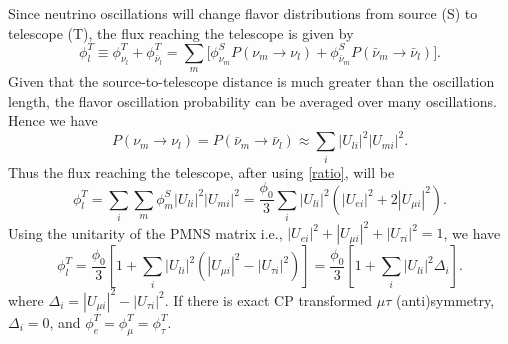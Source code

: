 \documentclass[11pt]{article}
\begin{document}
Since neutrino oscillations will change flavor distributions from source (S) to telescope (T)\cite{Xing:2006uk}, the flux reaching the telescope is given by\begin{equation}
\phi^T_{l}\equiv\phi^T_{\nu_l}+\phi^T_{\bar{\nu}_l}=\sum\limits_{m}
\Big[\phi^S_{\nu_m} P(\nu_m\to\nu_l)+\phi^S_{\bar{\nu}_m}P(\bar{\nu}_m\to
\bar{\nu}_l)\Big].\end{equation} Given that the source-to-telescope distance is much greater than the oscillation length, the flavor oscillation probability can be averaged over many oscillations. Hence we have \begin{equation}P(\nu_m\to\nu_l)=P(\bar{\nu}_m\to
\bar{\nu}_l)\approx \sum\limits_{i}|U_{l i}|^2|U_{m i}|^2.\end{equation} 
Thus the flux reaching the telescope, after using \eqref{ratio}, will be \begin{equation}
\phi_l^T=\sum\limits_{i}\sum\limits_{m}\phi_m^S|U_{l i}|^2|U_{m i}|^2=\frac{\phi_0}{3}\sum\limits_{i}|U_{l i}|^2(|U_{ei}|^2+2|U_{\mu i}|^2).
\end{equation} Using the unitarity of the PMNS matrix i.e., $|U_{ei}|^2+|U_{\mu i}|^2+|U_{\tau i}|^2=1$, we have \begin{equation}\phi_l^T=\frac{\phi_0}{3}[1+\sum\limits_{i}|U_{l i}|^2(|U_{\mu i}|^2-|U_{\tau i}|^2)]=\frac{\phi_0}{3}[1+\sum\limits_{i}|U_{l i}|^2\Delta_i].\end{equation} where $\Delta_i=|U_{\mu i}|^2-|U_{\tau i}|^2$. If there is exact CP transformed $\mu\tau$ (anti)symmetry, $\Delta_i=0$, and $\phi_e^T=\phi_\mu^T=\phi_\tau^T.$
\noindent
\end{document}
